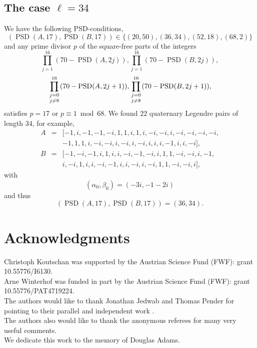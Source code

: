 \documentclass{article}
\theoremstyle{definition}
\newcommand{\PSD}{\operatorname{PSD}}
\begin{document}
\subsection{The case \texorpdfstring{$\ell=34$}{l=34}}
We have the following PSD-conditions,
$$(\PSD(A,17),\PSD(B,17))\in \{(20,50),(36,34),(52,18),(68,2)\}$$
and any prime divisor $p$ of the square-free parts of the integers
$$\prod_{j=1}^{16} (70-\PSD(A,2j)),\prod_{j=1}^{16} (70-\PSD(B,2j)),$$
$$\prod_{\textstyle\genfrac{}{}{0pt}{}{j=0}{j\ne 8}}^{16} (70-\PSD(A,2j+1)),\prod_{\textstyle\genfrac{}{}{0pt}{}{j=0}{j\ne 8}}^{16} (70-\PSD(B,2j+1)),$$
satisfies $p=17$ or $p\equiv 1\bmod 68$. %
We found $22$ quaternary Legendre pairs of length $34$, for example,
\begin{eqnarray*}A&=&[-1, i, -1, -1, -i, 1, 1, i, 1, i, -i, -i, i, -i, -i, -i, -i,\\
&& -1, 1, 1, i, -i, -i, i, -i, i, -i, i, i, i, -1, i, i, -i],\\ 
B&=&[-1, -i, -1, i, 1, i, i, -i, -1, -i, i, 1, 1, -i, -i, i, -1,\\
&&i, -i, 1, i, i, -i, -1,
    i, i, -i, i, -i, 1, 1, -i, -i, i],
\end{eqnarray*}
with
$$(\alpha_0,\beta_0)=(-3i,-1-2i)$$
and thus
$$(\PSD(A,17),\PSD(B,17))=(36,34).$$


\section*{Acknowledgments}
 Christoph Koutschan was supported by the Austrian Science Fund (FWF): grant 10.55776/I6130.\\
 Arne Winterhof was funded in part by the Austrian Science Fund (FWF): grant 10.55776/PAT4719224.\\
 The authors would like to thank Jonathan Jedwab and Thomas Pender for pointing to their parallel and independent work \cite{jp24}.\\
 The authors also would like to thank the anonymous referees for many very useful comments.\\
 We dedicate this work to the memory of Douglas Adams.
\end{document}
